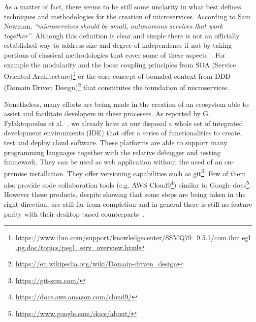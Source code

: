 \documentclass[a4paper, 10pt, conference]{ieeeconf}
\begin{document}
As a matter of fact, there seems to be still some unclarity in what best defines techniques and methodologies for the creation of microservices. According to Sam Newman\cite{s-newman}, \textit{“microservices should be small, autonomous services that work together”}. Although this definition is clear and simple there is not an officially established way to address size and degree of independence if not by taking portions of classical methodologies that cover some of these aspects~\cite{overview-platforms}. For example the modularity and the loose coupling principles from SOA (Service Oriented Architecture)\footnote{\url{https://www.ibm.com/support/knowledgecenter/SSMQ79_9.5.1/com.ibm.egl.pg.doc/topics/pegl_serv_overview.html}} or the core concept of bounded context from DDD (Domain Driven Design)\footnote{\url{https://en.wikipedia.org/wiki/Domain-driven_design}} that constitutes the foundation of microservices\cite{ddd-microservices}.

Nonetheless, many efforts are being made in the creation of an ecosystem able to assist and facilitate developers in these processes. As reported by G. Fylaktopoulos et al.~\cite{overview-platforms}, we already have at our disposal a whole set of integrated development environments (IDE) that offer a series of functionalities to create, test and deploy cloud software.  These platforms are able to support many programming languages together with the relative debugger and testing framework. They can be used as web application without the need of an on-premise installation. They offer versioning capabilities such as git\footnote{\url{https://git-scm.com/}}. Few of them also provide code collaboration tools (e.g. AWS Cloud9\footnote{\url{https://docs.aws.amazon.com/cloud9/}}) similar to Google docs\footnote{\url{https://www.google.com/docs/about/}}. However these products, despite showing that some steps are being taken in the right direction, are still far from completion and in general there is still no feature parity with their desktop-based counterparts~\cite{overview-platforms}.
\end{document}
